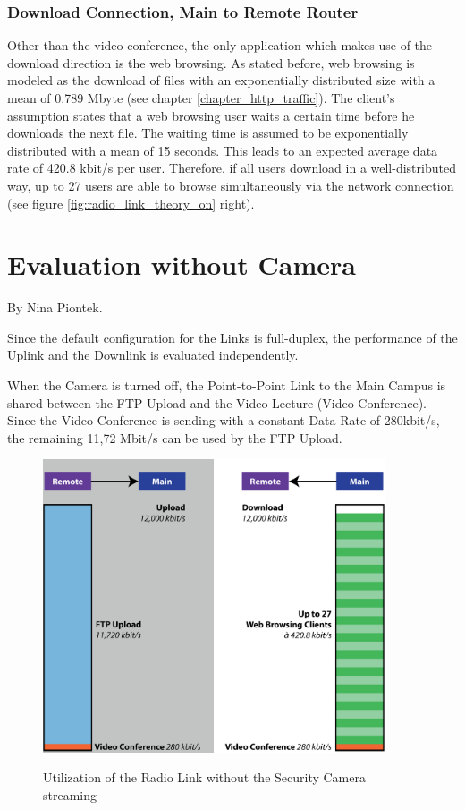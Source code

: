 \documentclass[a4paper,10pt]{book}\usepackage{graphicx}
\begin{document}
\subsection{Download Connection, Main to Remote Router}
Other than the video conference, the only application which makes use of the download direction is the web browsing. As stated before, web browsing is modeled as the download of files with an exponentially distributed size with a mean of 0.789 Mbyte (see chapter \ref{chapter_http_traffic}). The client's assumption states that a web browsing user waits a certain time before he downloads the next file. The waiting time is assumed to be exponentially distributed with a mean of 15 seconds. This leads to an expected average data rate of 420.8 kbit/s per user. Therefore, if all users download in a well-distributed way, up to 27 users are able to browse simultaneously via the network connection (see figure \ref{fig:radio_link_theory_on} right).

\chapter{Evaluation without Camera}
By Nina Piontek.

Since the default configuration for the Links is full-duplex, the performance of the Uplink and the Downlink is evaluated independently.

When the Camera is turned off, the Point-to-Point Link to the Main Campus is shared between the FTP Upload and the Video Lecture (Video Conference).
Since the Video Conference is sending with a constant Data Rate of 280kbit/s, the remaining 
11,72 Mbit/s can be used by the FTP Upload.
\begin{figure}[!ht]
  \centering
    \includegraphics[width=0.9\textwidth]{graphics-02.eps}
    \label{fig:g2}
    \caption{Utilization of the Radio Link without the Security Camera streaming}
\end{figure}
\end{document}

